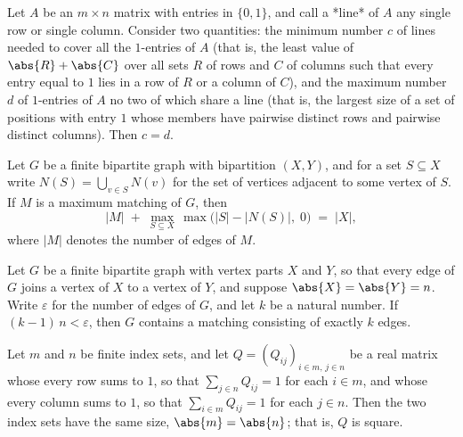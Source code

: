 \begin{theorem}
\label{SimpleGraph.konig_matrix}
Let $A$ be an $m \times n$ matrix with entries in $\{0,1\}$, and call a *line* of $A$
any single row or single column. Consider two quantities: the minimum number $c$ of
lines needed to cover all the $1$-entries of $A$ (that is, the least value of $\abs{R} +
\abs{C}$ over all sets $R$ of rows and $C$ of columns such that every entry equal to $1$
lies in a row of $R$ or a column of $C$), and the maximum number $d$ of $1$-entries of
$A$ no two of which share a line (that is, the largest size of a set of positions with
entry $1$ whose members have pairwise distinct rows and pairwise distinct columns). Then
$c = d$.
\end{theorem}

\begin{theorem}
\label{SimpleGraph.konig_ore_defect}
Let $G$ be a finite bipartite graph with bipartition $(X, Y)$, and for a set $S
\subseteq X$ write $N(S) = \bigcup_{v \in S} N(v)$ for the set of vertices adjacent to
some vertex of $S$. If $M$ is a maximum matching of $G$, then
\[
\lvert M\rvert \;+\; \max_{S \subseteq X}\,\max\bigl(\lvert S\rvert - \lvert
N(S)\rvert,\;0\bigr) \;=\; \lvert X\rvert,
\]
where $\lvert M\rvert$ denotes the number of edges of $M$.
\end{theorem}

\begin{theorem}
\label{SimpleGraph.exists_matching_card_eq_of_card_edges_gt}
Let $G$ be a finite bipartite graph with vertex parts $X$ and $Y$, so that every edge of
$G$ joins a vertex of $X$ to a vertex of $Y$, and suppose $\abs{X} = \abs{Y} = n$. Write
$\varepsilon$ for the number of edges of $G$, and let $k$ be a natural number. If
$(k-1)\,n < \varepsilon$, then $G$ contains a matching consisting of exactly $k$ edges.
\end{theorem}

\begin{theorem}
\label{SimpleGraph.doublyStochastic_card_eq}
Let $m$ and $n$ be finite index sets, and let $Q = (Q_{ij})_{i \in m,\, j \in n}$ be a
real matrix whose every row sums to $1$, so that $\sum_{j \in n} Q_{ij} = 1$ for each $i
\in m$, and whose every column sums to $1$, so that $\sum_{i \in m} Q_{ij} = 1$ for each
$j \in n$. Then the two index sets have the same size, $\abs{m} = \abs{n}$; that is, $Q$
is square.
\end{theorem}

